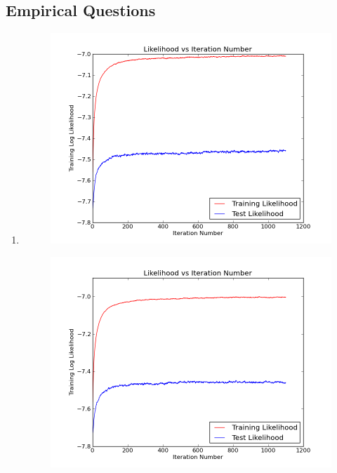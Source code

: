 \documentclass[11pt,a4paper]{article}
\begin{document}
	\subsection{Empirical Questions}
	\begin{enumerate}
		\item
			\begin{figure}[h]
				\begin{center}
					\includegraphics[scale=0.5]{../train_test_1}
				\end{center}
			\end{figure}
			\begin{figure}[h]
				\begin{center}
					\includegraphics[scale=0.5]{../train_test_2}

\end{center}
\end{figure}
\end{enumerate}
\end{document}
